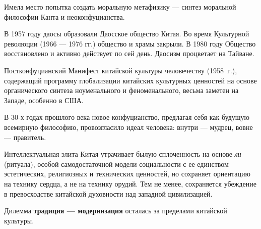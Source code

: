 \documentclass[twoside,a4paper]{article}
\begin{document}
{
Имела место попытка создать {\textquotedbl}моральную метафизику{\textquotedbl} — синтез моральной философии Канта и
неоконфуцианства. }

{
В 1957 году даосы образовали Даосское общество Китая. Во время Культурной революции (1966 — 1976 гг.) общество и храмы
закрыли. В 1980 году Общество восстановлено и активно действует по сей день. Даосизм процветает на Тайване. }

{
Постконфуцианский {\textquotedbl}Манифест китайской культуры человечеству{\textquotedbl} (1958~г.), содержащий программу
глобализации китайских культурных ценностей на основе органического синтеза ноуменального и феноменального, весьма
заметен на Западе, особенно в США. }

{
В 30-х годах прошлого века новое конфуцианство, предлагая себя как будущую всемирную философию, провозгласило идеал
человека: {\textquotedbl}внутри — мудрец, вовне — правитель{\textquotedbl}.}

{
Интеллектуальная элита Китая утрачивает былую сплоченность на основе \textit{ли} (ритуала), особой самодостаточной
модели социальности с ее единством эстетических, {\textquotedbl}религиозных{\textquotedbl} и технических ценностей, но
сохраняет ориентацию {\textquotedbl}на технику сердца{\textquotedbl}, а не на {\textquotedbl}технику
орудий{\textquotedbl}. Тем не менее, сохраняется убеждение в превосходстве китайской духовности над западной
цивилизацией.}

{
Дилемма \textbf{традиция — модернизация} осталась за пределами китайской культуры.}
\end{document}
